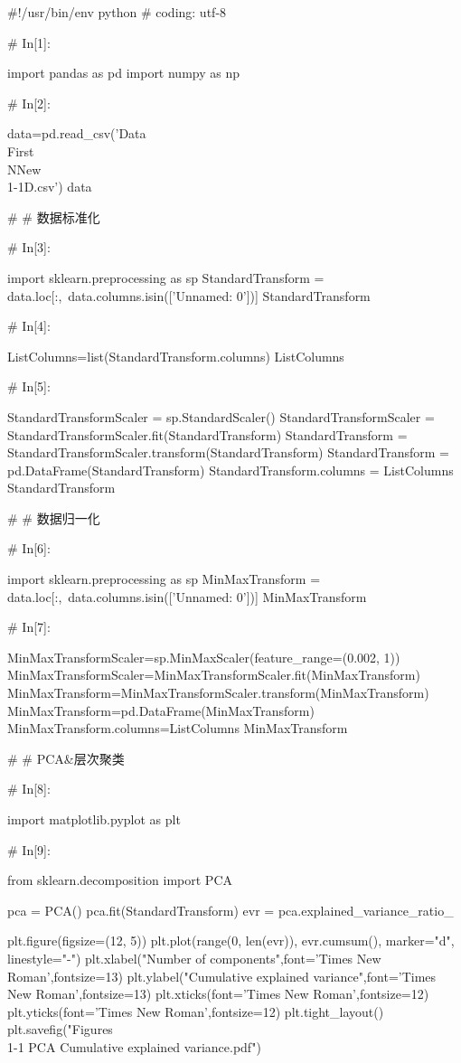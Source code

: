 \documentclass{MathorCupModeling}
\begin{document}
\begin{python}
#!/usr/bin/env python
# coding: utf-8

# In[1]:


import pandas as pd
import numpy as np


# In[2]:


data=pd.read_csv('Data\\First\\NNew\\1-1D.csv')
data


# # 数据标准化

# In[3]:


import sklearn.preprocessing as sp
StandardTransform = data.loc[:,~data.columns.isin(['Unnamed: 0'])]
StandardTransform


# In[4]:


ListColumns=list(StandardTransform.columns)
ListColumns


# In[5]:


StandardTransformScaler = sp.StandardScaler()
StandardTransformScaler = StandardTransformScaler.fit(StandardTransform)
StandardTransform = StandardTransformScaler.transform(StandardTransform)
StandardTransform = pd.DataFrame(StandardTransform)
StandardTransform.columns = ListColumns
StandardTransform


# # 数据归一化

# In[6]:


import sklearn.preprocessing as sp
MinMaxTransform = data.loc[:,~data.columns.isin(['Unnamed: 0'])]
MinMaxTransform


# In[7]:


MinMaxTransformScaler=sp.MinMaxScaler(feature_range=(0.002, 1))
MinMaxTransformScaler=MinMaxTransformScaler.fit(MinMaxTransform)
MinMaxTransform=MinMaxTransformScaler.transform(MinMaxTransform)
MinMaxTransform=pd.DataFrame(MinMaxTransform)
MinMaxTransform.columns=ListColumns
MinMaxTransform


# # PCA&层次聚类

# In[8]:


import matplotlib.pyplot as plt


# In[9]:


from sklearn.decomposition import PCA

pca = PCA()
pca.fit(StandardTransform)
evr = pca.explained_variance_ratio_

plt.figure(figsize=(12, 5))
plt.plot(range(0, len(evr)), evr.cumsum(), marker="d", linestyle="-")
plt.xlabel("Number of components",font='Times New Roman',fontsize=13)
plt.ylabel("Cumulative explained variance",font='Times New Roman',fontsize=13)
plt.xticks(font='Times New Roman',fontsize=12)
plt.yticks(font='Times New Roman',fontsize=12)
plt.tight_layout()
plt.savefig("Figures\\1-1 PCA Cumulative explained variance.pdf")



\end{python}
\end{document}

